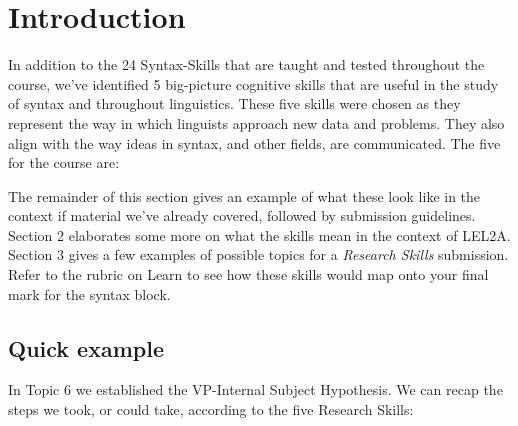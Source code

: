 \documentclass{article}
\begin{document}
\maketitle
\subtitle{Research Skills Assignment}

\section{Introduction}
In addition to the 24 Syntax-Skills that are taught and tested throughout the course, we've identified 5 big-picture cognitive skills that are useful in the study of syntax and throughout linguistics.
These five skills were chosen as they represent the way in which linguists approach new data and problems.
They also align with the way ideas in syntax, and other fields, are communicated.
The five  for the course are:
\begin{exe}
    \label{hypothesise_1}
    \label{supporthypothesis_1}
    \label{definehypothesis_1}
    \label{refutehypothesis_1}
    \label{diagnosticlimits_1}
\end{exe}

The remainder of this section gives an example of what these look like in the context if material we've already covered, followed by submission guidelines. Section 2 elaborates some more on what the skills mean in the context of LEL2A. Section 3 gives a few examples of possible topics for a \emph{Research Skills} submission.  Refer to the rubric on Learn to see how these skills would map onto your final mark for the syntax block.

    \subsection{Quick example}
In Topic 6 we established the VP-Internal Subject Hypothesis. We can recap the steps we took, or could take, according to the five Research Skills:
\end{document}
